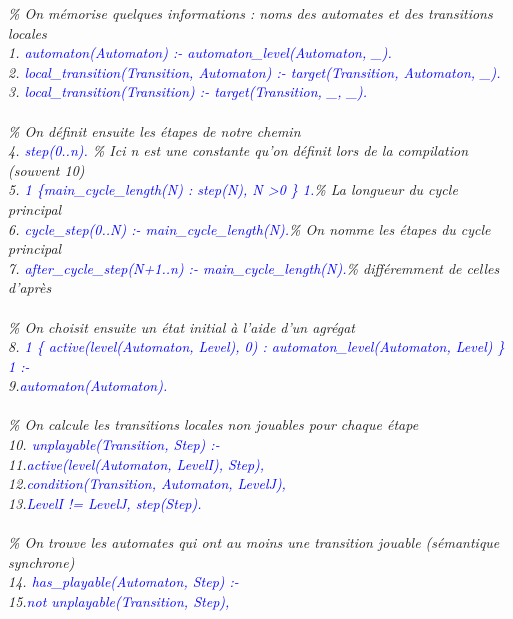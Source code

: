\documentclass[10pt,a4paper]{article}
\begin{document}
\emph{
	\% On mémorise quelques informations : noms des automates et des transitions locales\\
	1. \textcolor{blue}{automaton(Automaton) :- automaton\_level(Automaton, \_).}\\
	2. \textcolor{blue}{local\_transition(Transition, Automaton) :- target(Transition, Automaton, \_).}\\
	3. \textcolor{blue}{local\_transition(Transition) :- target(Transition, \_, \_).}\\ \\
	\% On définit ensuite les étapes de notre chemin\\
	4. \textcolor{blue}{step(0..n).} \% Ici n est une constante qu'on définit lors de la compilation (souvent 10)\\
	5. \textcolor{blue}{1 \{main\_cycle\_length(N) : step(N), N \textgreater 0 \} 1.}\% La longueur du cycle principal\\
	6. \textcolor{blue}{cycle\_step(0..N) :- main\_cycle\_length(N).}\% On nomme les étapes du cycle principal\\
	7. \textcolor{blue}{after\_cycle\_step(N+1..n) :- main\_cycle\_length(N).}\% différemment de celles d'après\\ \\
	\% On choisit ensuite un état initial à l'aide d'un agrégat\\
	8. \textcolor{blue}{1 \{ active(level(Automaton, Level), 0) : automaton\_level(Automaton, Level) \} 1 :-}\\
	9.\qquad\qquad\textcolor{blue}{automaton(Automaton).}\\ \\
	\% On calcule les transitions locales non jouables pour chaque étape\\
	10. \textcolor{blue}{unplayable(Transition, Step) :-}\\
	11.\qquad\qquad\textcolor{blue}{active(level(Automaton, LevelI), Step),}\\
	12.\qquad\qquad\textcolor{blue}{condition(Transition, Automaton, LevelJ),}\\
	13.\qquad\qquad\textcolor{blue}{LevelI != LevelJ, step(Step).}\\ \\
	\% On trouve les automates qui ont au moins une transition jouable (sémantique synchrone)\\
	14. \textcolor{blue}{has\_playable(Automaton, Step) :-}\\
	15.\qquad\qquad\textcolor{blue}{not unplayable(Transition, Step),}\\
}
\end{document}
